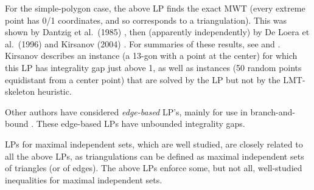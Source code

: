 \documentclass[final]{siamltex}
\begin{document}
For the simple-polygon case, the above LP finds the exact MWT (every extreme point
has 0/1 coordinates, and so corresponds to a triangulation).
This was shown by Dantzig et al.~(1985)  \cite[Thm.~7]{dantzig1985triangulations},
then (apparently independently) by De Loera et al.~(1996) \cite[Thm.~4.1(i)]{de1996polytope}
and Kirsanov (2004) \cite[Cor.~3.6.2]{kirsanov2004minimal}.
For summaries of these results, see \cite[Ch.~8]{de2010triangulations} and \cite{takeuchi1998polytopes}.
Kirsanov describes an instance (a 13-gon with a point at the center) 
for which this LP has integrality gap just above 1,
as well as instances (50 random points equidistant from a center point)
that are solved by the LP but not by the LMT-skeleton heuristic.

Other authors have considered {\em edge-based} LP's, mainly for use in branch-and-bound
\cite{kyoda1996study,kyoda1997branch,ono1996package,tajima1998optimality,aurenhammer2000optimal}.
These edge-based LPs have unbounded integrality gaps.

LPs for maximal independent sets, which are well studied, are closely related to all the above LPs,
as triangulations can be defined as maximal independent sets of triangles (or of edges).
The above LPs enforce some, but not all, well-studied inequalities for maximal independent sets.
\end{document}
